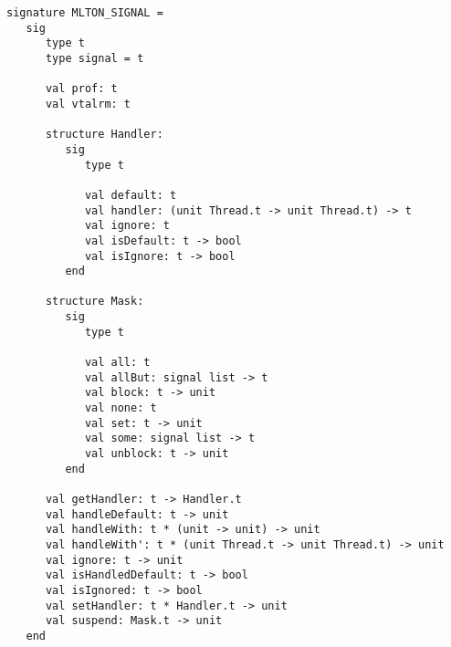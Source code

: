 \begin{verbatim}
signature MLTON_SIGNAL =
   sig
      type t
      type signal = t

      val prof: t
      val vtalrm: t

      structure Handler:
         sig
            type t

            val default: t
            val handler: (unit Thread.t -> unit Thread.t) -> t
            val ignore: t
            val isDefault: t -> bool
            val isIgnore: t -> bool
         end

      structure Mask:
         sig
            type t
               
            val all: t
            val allBut: signal list -> t
            val block: t -> unit
            val none: t
            val set: t -> unit
            val some: signal list -> t
            val unblock: t -> unit
         end

      val getHandler: t -> Handler.t
      val handleDefault: t -> unit
      val handleWith: t * (unit -> unit) -> unit
      val handleWith': t * (unit Thread.t -> unit Thread.t) -> unit
      val ignore: t -> unit
      val isHandledDefault: t -> bool
      val isIgnored: t -> bool
      val setHandler: t * Handler.t -> unit
      val suspend: Mask.t -> unit
   end
\end{verbatim}

